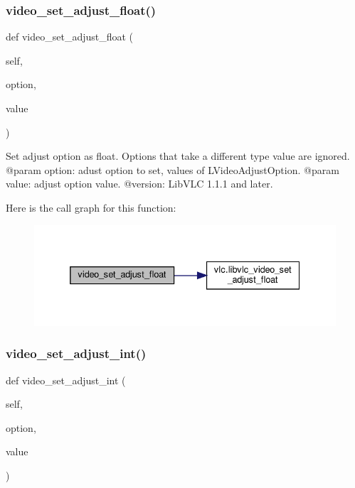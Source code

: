 \subsubsection{\texorpdfstring{video\+\_\+set\+\_\+adjust\+\_\+float()}{video\_set\_adjust\_float()}}
{\footnotesize\ttfamily def video\+\_\+set\+\_\+adjust\+\_\+float (\begin{DoxyParamCaption}\item[{}]{self,  }\item[{}]{option,  }\item[{}]{value }\end{DoxyParamCaption})}

\begin{DoxyVerb}Set adjust option as float. Options that take a different type value
are ignored.
@param option: adust option to set, values of L{VideoAdjustOption}.
@param value: adjust option value.
@version: LibVLC 1.1.1 and later.
\end{DoxyVerb}
 Here is the call graph for this function\+:
\nopagebreak
\begin{figure}[H]
\begin{center}
\leavevmode
\includegraphics[width=332pt]{classvlc_1_1_media_player_a8961d32c677daf7be108038c183fb911_cgraph}
\end{center}
\end{figure}
\mbox{\label{classvlc_1_1_media_player_ad8f3725ce406170a3703805dae8733f1}} 
\subsubsection{\texorpdfstring{video\+\_\+set\+\_\+adjust\+\_\+int()}{video\_set\_adjust\_int()}}
{\footnotesize\ttfamily def video\+\_\+set\+\_\+adjust\+\_\+int (\begin{DoxyParamCaption}\item[{}]{self,  }\item[{}]{option,  }\item[{}]{value }\end{DoxyParamCaption})}

